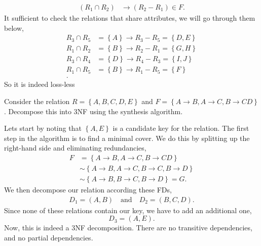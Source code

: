\documentclass[working, oneside]{../../Preambles/tuftebook}
\begin{document}
\begin{solution}
\begin{align*}
    (R_1 \cap R_2) &\to (R_2 - R_1) \in F
.\end{align*}
It sufficient to check the relations that share attributes, we will go through them below,
\begin{align*}
    R_3 \cap R_5 &= \left\{ A \right\}  \to R_3 - R_5 = \left\{ D, E \right\} \\
    R_1 \cap R_2 &= \left\{ B \right\} \to R_2 - R_1 = \left\{ G, H \right\} \\
    R_3 \cap R_4 &= \left\{ D \right\} \to R_4 - R_3 = \left\{ I, J \right\} \\
    R_1 \cap R_5 &= \left\{ B \right\} \to R_1 - R_5 = \left\{ F \right\} \\
.\end{align*}
So it is indeed loss-less
\end{solution}
\begin{exercise}[5]
Consider the relation $R = \left\{ A, B, C, D, E \right\} $ and $F = \left\{ A \to B, A \to C, B \to CD \right\} $. Decompose this into 3NF using the synthesis algorithm.
\end{exercise}
Lets start by noting that $\left\{ A, E \right\} $ is a candidate key for the relation. The first step in the algorithm is to find a minimal cover. We do this by splitting up the right-hand side and eliminating redundancies,
\begin{align*}
    F &= \left\{ A \to B, A \to C, B \to CD \right\} \\
      &\sim \left\{ A \to B, A \to C, B \to C, B \to D \right\} \\
      &\sim \left\{ A \to B, B \to C, B \to D \right\} = G
.\end{align*}
We then decompose our relation according these FDs,
\begin{align*}
    D_1 = \left( A, B \right) \quad\text{and}\quad D_2=\left( B, C, D \right) 
.\end{align*}
Since none of these relations contain our key, we have to add an additional one,
\[
D_3 = \left( A, E \right) 
.\]
Now, this is indeed a 3NF decomposition. There are no transitive dependencies, and no partial dependencies.
\end{document}
